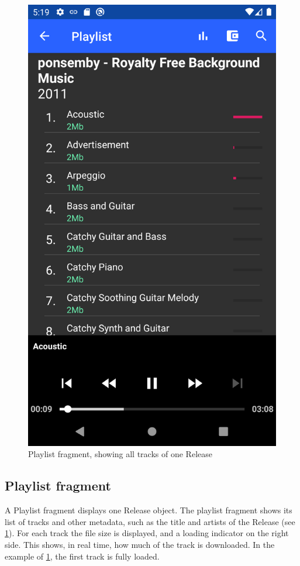 \begin{figure}
        \includegraphics[width=1\linewidth]{implementation/screenshot-playlist.png}
        \caption{Playlist fragment, showing all tracks of one Release}
        \label{fig:screenshot-playlist}
    \endminipage\hfill
\end{figure}
\subsection{Playlist fragment}
A Playlist fragment displays one Release object. The playlist fragment shows its list of tracks and other metadata, such as the title and artists of the Release (see \ref{fig:screenshot-playlist}). For each track the file size is displayed, and a loading indicator on the right side. This shows, in real time, how much of the track is downloaded. In the example of \ref{fig:screenshot-playlist}, the first track is fully loaded.
